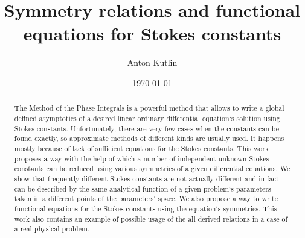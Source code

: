 \documentclass[aps,prl,preprint,superscriptaddress]{revtex4}
\begin{document}

\title{Symmetry relations and functional equations for Stokes constants}


\author{Anton Kutlin}


\date{\today}

\begin{abstract}
The Method of the Phase Integrals is a powerful method that allows to write a global defined asymptotics of a desired linear ordinary differential equation`s solution using Stokes constants. Unfortunately, there are very few cases when the constants can be found exactly, so approximate methods of different kinds \cite{white,ours} are usually used. It happens mostly because of lack of sufficient equations for the Stokes constants. This work proposes a way with the help of which a number of independent unknown Stokes constants can be reduced using various symmetries of a given differential equations. We show that frequently different Stokes constants are not actually different and in fact can be described by the same analytical function of a given problem`s parameters taken in a different points of the parameters` space.  We also propose a way to write functional equations for the Stokes constants using the equation`s symmetries. This work also contains an example of possible usage of the all derived relations in a case of a real physical problem.
\end{abstract}
\end{document}
